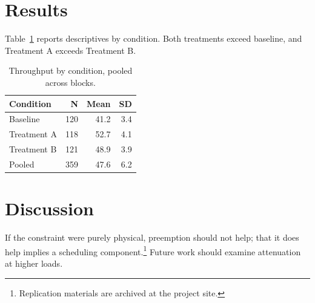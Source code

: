 \documentclass[10pt,twocolumn]{article}
\begin{document}
\section{Results}
Table~\ref{tab:main} reports descriptives by condition. Both treatments exceed
baseline, and Treatment A exceeds Treatment B.

\begin{table}[h]
\centering
\begin{tabular}{lrrr}
\toprule
Condition & N & Mean & SD \\
\midrule
Baseline & 120 & 41.2 & 3.4 \\
Treatment A & 118 & 52.7 & 4.1 \\
Treatment B & 121 & 48.9 & 3.9 \\
Pooled & 359 & 47.6 & 6.2 \\
\bottomrule
\end{tabular}
\caption{Throughput by condition, pooled across blocks.}
\label{tab:main}
\end{table}

\section{Discussion}
If the constraint were purely physical, preemption should not help; that it does
help implies a scheduling component.\footnote{Replication materials are archived
at the project site.} Future work should examine attenuation at higher loads.
\end{document}

